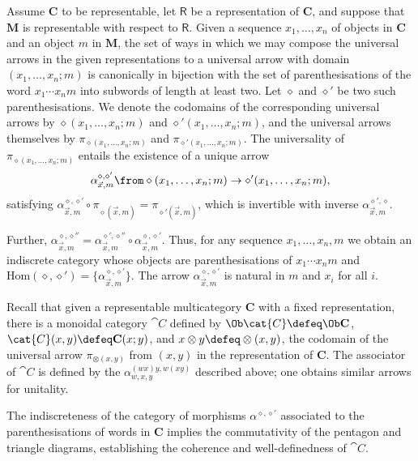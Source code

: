 Assume \(\mathbf{C}\) to be representable, let \(\mathsf{R}\) be a representation of \(\mathbf{C}\),
and suppose that \(\mathbf{M}\) is representable with respect to \(\mathsf{R}\).
Given a sequence \(x_{1},\ldots,x_{n}\) of objects in \(\mathbf{C}\) and an object \(m\) in \(\mathbf{M}\),
the set of ways in which we may compose the universal arrows in the given representations to a universal arrow with domain \((x_{1},\ldots,x_{n};m)\)
is canonically in bijection with the set of parenthesisations of the word \(x_{1}\cdots x_{n}m\)
into subwords of length at least two.
Let \(\diamond\) and \(\diamond'\) be two such parenthesisations.
We denote the codomains of the corresponding universal arrows by \(\diamond(x_{1},\ldots,x_{n};m)\) and \(\diamond'(x_{1},\ldots,x_{n};m)\),
and the universal arrows themselves by \(\pi_{\diamond(x_{1},\ldots,x_{n};m)}\) and \(\pi_{\diamond'(x_{1},\ldots,x_{n};m)}\).
The universality of \(\pi_{\diamond(x_{1},\ldots,x_{n};m)}\) entails the existence of
a unique arrow
\[
  \alpha_{\vec{x},m}^{\diamond,\diamond'}\from \diamond(x_{1},\ldots,x_{n};m)\to \diamond'(x_{1},\ldots,x_{n};m),
\]
satisfying \(\alpha_{\vec{x},m}^{\diamond,\diamond'} \circ \pi_{\diamond(\vec{x},m)} = \pi_{\diamond'(\vec{x},m)}\),
which is invertible with inverse \(\alpha_{\vec{x},m}^{\diamond',\diamond}\).

Further, \(\alpha_{\vec{x},m}^{\diamond,\diamond''} = \alpha_{\vec{x},m}^{\diamond',\diamond''} \circ \alpha_{\vec{x},m}^{\diamond,\diamond'}\).
Thus, for any sequence \(x_{1},\ldots,x_{n},m\) we obtain
an indiscrete category
whose objects are parenthesisations of \(x_{1}\cdots x_{n}m\)
and \(\mathrm{Hom}(\diamond,\diamond') = \{\alpha_{\vec{x},m}^{\diamond,\diamond'}\}\).
The arrow \(\alpha_{\vec{x},m}^{\diamond,\diamond'}\) is natural in \(m\) and \(x_{i}\) for all \(i\).

\begin{remark}\label{rmk:monoidal-from-multi}
  Recall that given a representable multicategory \(\mathbf{C}\) with a fixed representation,
  there is a monoidal category \(\cat{C}\) defined by \(\Ob\cat{C} \defeq \Ob\mathbf{C}\),
  \(\cat{C}(x,y) \defeq \mathbf{C}(x;y)\),
  and \(x \otimes y \defeq \otimes(x,y)\),
  the codomain of the universal arrow \(\pi_{\otimes(x,y)}\) from \((x,y)\) in the representation of \(\mathbf{C}\).
  The associator of \(\cat{C}\) is defined by the
  \(\alpha_{w,x,y}^{(wx)y,w(xy)}\) described above;
  one obtains similar arrows for unitality.

  The indiscreteness of the category of morphisms \(\alpha^{\diamond,\diamond'}\)
  associated to the parenthesisations of words in \(\mathbf{C}\)
  implies the commutativity of the pentagon and triangle diagrams,
  establishing the coherence and well-definedness of \(\cat{C}\).
\end{remark}

